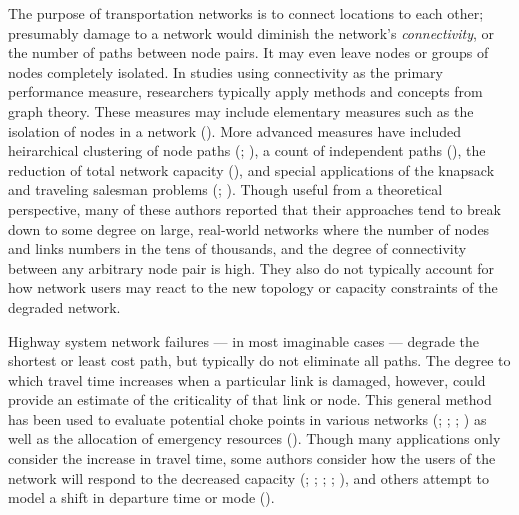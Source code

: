 \documentclass[]{ascelike-new}
\begin{document}
The purpose of transportation networks is to connect locations to each
other; presumably damage to a network would diminish the network's
\emph{connectivity}, or the number of paths between node pairs. It may
even leave nodes or groups of nodes completely isolated. In studies
using connectivity as the primary performance measure, researchers
typically apply methods and concepts from graph theory. These measures
may include elementary measures such as the isolation of nodes in a
network (). More
advanced measures have included heirarchical clustering of node paths
(;
), a count of independent
paths (), the reduction of
total network capacity (), and
special applications of the knapsack and traveling salesman problems
(;
). Though useful
from a theoretical perspective, many of these authors reported that
their approaches tend to break down to some degree on large, real-world
networks where the number of nodes and links numbers in the tens of
thousands, and the degree of connectivity between any arbitrary node
pair is high. They also do not typically account for how network users
may react to the new topology or capacity constraints of the degraded
network.

Highway system network failures --- in most imaginable cases --- degrade
the shortest or least cost path, but typically do not eliminate all
paths. The degree to which travel time increases when a particular link
is damaged, however, could provide an estimate of the criticality of
that link or node. This general method has been used to evaluate
potential choke points in various networks
(;
;
;
) as well as the
allocation of emergency resources (). Though many applications only consider the increase in travel
time, some authors consider how the users of the network will respond to
the decreased capacity (; ;
;
;
), and others attempt to model a
shift in departure time or mode ().
\end{document}

